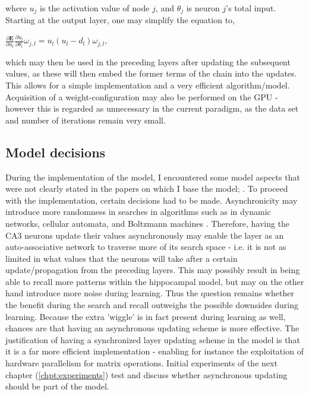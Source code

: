 \noindent
where $u_j$ is the activation value of node $j$, and $\theta_j$ is neuron $j$'s total input. Starting at the output layer, one may simplify the equation to,

\begin{center}
\begin{math}
    \frac{\partial \textbf{E}}{\partial u_l} \frac{\partial u_l}{\partial \theta_l} \omega_{j,l} = 
    u_l (u_l - d_l) \omega_{j,l},
\end{math}
\end{center}

which may then be used in the preceding layers after updating the subsequent values, as these will then embed the former terms of the chain into the updates. This allows for a simple implementation and a very efficient algorithm/model. Acquisition of a weight-configuration may also be performed on the GPU - however this is regarded as unnecessary in the current paradigm, as the data set and number of iterations remain very small.


\subsection{Model decisions}

During the implementation of the model, I encountered some model aspects that were not clearly stated in the papers on which I base the model; \citep{Hattori2014, Hattori2010}. To proceed with the implementation, certain decisions had to be made.
Asynchronicity may introduce more randomness in searches in algorithms such as in dynamic networks, cellular automata, and Boltzmann machines \citep{Bar-yam1997}. Therefore, having the CA3 neurons update their values asynchronously may enable the layer as an auto-associative network to traverse more of its search space - i.e. it is not as limited in what values that the neurons will take after a certain update/propagation from the preceding layers. This may possibly result in being able to recall more patterns within the hippocampal model, but may on the other hand introduce more noise during learning. Thus the question remains whether the benefit during the search and recall outweighs the possible downsides during learning. Because the extra 'wiggle' is in fact present during learning as well, chances are that having an asynchronous updating scheme is more effective.
The justification of having a synchronized layer updating scheme in the model is that it is a far more efficient implementation - enabling for instance the exploitation of hardware parallelism for matrix operations. Initial experiments of the next chapter (\ref{chpt:experiments}) test and discuss whether asynchronous updating should be part of the model.
\\

